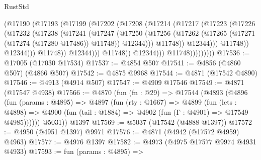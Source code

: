 \begin{lexlean}{RustStd}
\begin{coremodule}
{\begin{coremodule}
{{{{{{{{{{{{{{{{{{{{{{{{{{{{{                                    (@17190
                                      (@17193
                                        (@17199
                                          (@17202
                                            (@17208
                                              (@17214
                                                (@17217
                                                  (@17223
                                                    (@17226
                                                      (@17232
                                                        (@17238
                                                          (@17241
                                                            (@17247
                                                              (@17250
                                                                (@17256
                                                                  (@17262
                                                                    (@17265
                                                                      (@17271
                                                                        (@17274 (@17280 @17486))
                                                                        @11748))
                                                                    @12344)))
                                                              @11748))
                                                          @12344)))
                                                    @11748))
                                                @12344)))
                                          @11748))
                                      @12344)))
                                @11748))
                            @12344)))
                      @11748)))))))))
@17536 := @17005 (@17030 @17534)
@17537 := @4854 @507
@17541 := @4856 (@4860 @507) (@4866 @507)
@17542 := @4875 @9968
@17544 := @4871 (@17542 @4890)
@17546 := @4913 (@4914 @507)
@17547 := @4909 @17546
@17549 := @4871 (@17547 @4938)
@17566 := @4870
    (fun (fn : @29) =>
    @17544
      (@4893
        (@4896
          (fun (params : @4895) =>
          @4897
            (fun (rty : @1667) =>
            @4899
              (fun (lets : @4898) =>
              @4900 (fun (tail : @1884) => @4902 (fun (Γ : @4901) => @17549 @4985))))))
        @5031))
    @1397
@17569 := @5037 (@17542 (@4888 @1397))
@17572 := @4950 (@4951 @1397) @9971
@17576 := @4871 (@4942 (@17572 @4959) @4963)
@17577 := @4976 @1397
@17582 := @4973 (@4975 @17577 @9974 @4931 @4933)
@17593 := fun (params : @4895) =>
}}}}}}}}}}}}}}}}}}}}}}}}}}}}}
\end{coremodule}}
\end{coremodule}
\end{lexlean}
